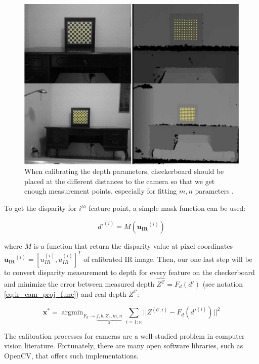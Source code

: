 \documentclass[a4paper]{report}
\numberwithin{figure}{section}
\newcommand{\argmin}{\mathop{\mathrm{argmin}}}
\begin{document}
\begin{figure}[H]
	\centering
  \includegraphics[width=0.7\linewidth,natwidth=640,natheight=640]
  {fig/ref_imgs/checkerboard_depth.png}
  \caption[Checkboard Calibration for Depth]{When calibrating the depth 
  parameters, checkerboard should be placed at the different distances to the 
  camera so that we get enough measurement points, especially for fitting 
  $m,n$ parameters \parencite{Karan2015}.}
  \label{fig:checkerboard_depth}
\end{figure}

To get the disparity for $i^{th}$ feature point, a simple mask function can be 
used:

\begin{equation}
  d'^{(i)} = M(\mathbf{u_{IR}}^{(i)})
\end{equation}

where $M$ is a function that return the disparity value at pixel coordinates 
$\mathbf{u_{IR}}^{(i)}=[u_{IR}^{(i)},u_{IR}^{(i)}]^T$ of calibrated IR image.  
Then, our one last step will be to convert disparity measurement to depth for 
every feature on the checkerboard and minimize the error between measured 
depth 
$\hat{Z^{\mathcal{C}}}=F_d(d')$ (see notation \eqref{eq:ir_cam_proj_func}) and 
real depth 
$Z^{\mathcal{C}}$:

\begin{equation}\label{eq:proj_lsq}
  \mathbf{x^*} = 
  \argmin_{F_d \rightarrow \underbrace{f, b, Z_r, m, n}_{\mathbf{x}}}
  \sum_{i=1:n} || Z^{(\mathcal{C}, i)} - F_d(d'^{(i)})  ||^2
\end{equation}

The calibration processes for cameras are a well-studied problem in computer 
vision literature.  Fortunately, there are many open software libraries, such 
as OpenCV, that offers such implementations.
\end{document}
